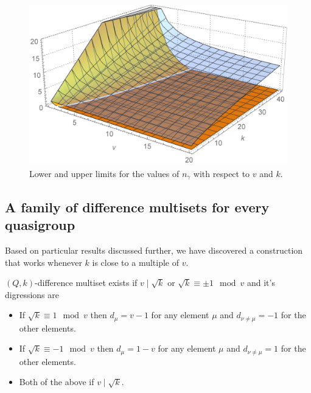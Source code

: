     \begin{figure}
        \includegraphics[width=\textwidth]{assets/boundingSurfaces}
        \caption{Lower and upper limits for the values of $n_\gamma$ with respect to $v$ and $k$.}
        \label{general:figure:limits}
    \end{figure}
    
\subsection{A family of difference multisets for every quasigroup}
    Based on particular results discussed further, we have discovered a construction that works whenever $k$ is close to a multiple of $v$.
    
    \begin{theorem}
        \label{regular:theorem:regular}
        $(Q,k)$-difference multiset exists if $v \mid \sqrt k$ or $\sqrt k \equiv \pm 1 \mod v$ and it's digressions are 
            \begin{itemize}
                \item If $\sqrt k \equiv 1 \mod v$ then $d_\mu = v-1$ for any element $\mu$ and $d_{\nu \neq \mu} = -1$ for the other elements.
                \item If $\sqrt k \equiv -1 \mod v$ then $d_\mu =1-v$ for any element $\mu$ and $d_{\nu \neq \mu} = 1$ for the other elements.
                \item Both of the above if $v \mid \sqrt k$.
            \end{itemize}
    \end{theorem}
    
